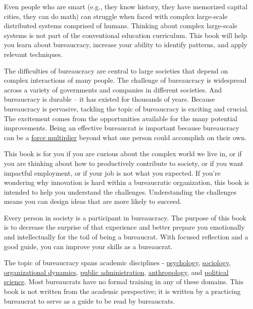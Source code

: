 Even people who are smart (e.g., they know history, they have memorized capital cities, they can do math) can struggle when faced with complex large-scale distributed systems comprised of humans. Thinking about complex large-scale systems is not part of the conventional education curriculum. This book will help you learn about bureaucracy, increase your ability to identify patterns, and apply relevant techniques.


The difficulties of bureaucracy are central to large societies that depend on complex interactions of many people. The challenge of bureaucracy is widespread across a variety of governments and companies in different societies. And bureaucracy is durable -- it has existed for thousands of years. Because bureaucracy is pervasive, tackling the topic of bureaucracy is exciting and crucial. The excitement comes from the opportunities available for the many potential improvements.
Being an effective bureaucrat is important because bureaucracy can be a \href{https://en.wikipedia.org/wiki/Force_multiplication}{force multiplier} beyond what one person could accomplish on their own.


This book is for you if you are curious about the complex world we live in, or if you are thinking about how to productively contribute to society, or if you want impactful employment, or if your job is not what you expected. If you're wondering why innovation is hard within a bureaucratic organization, this book is intended to help you understand the challenges. Understanding the challenges means you can design ideas that are more likely to succeed.


Every person in society is a participant in bureaucracy. The purpose of this book is to decrease the surprise of that experience and better prepare you emotionally and intellectually for the toil of being a bureaucrat. With focused reflection and a good guide, you can improve your skills as a bureaucrat. 

The topic of bureaucracy spans academic disciplines - \href{https://en.wikipedia.org/wiki/Psychology}{psychology}, \href{https://en.wikipedia.org/wiki/Sociology}{sociology}, \href{https://en.wikipedia.org/wiki/Organizational_behavior}{organizational dynamics}, \href{https://en.wikipedia.org/wiki/Public_administration}{public administration}, \href{https://en.wikipedia.org/wiki/Anthropology}{anthropology}, and  \href{https://en.wikipedia.org/wiki/Political_science}{political science}. Most bureaucrats have no formal training in any of these domains. This book is not written from the academic perspective; it is written by a practicing bureaucrat to serve as a guide to be read by bureaucrats. 

